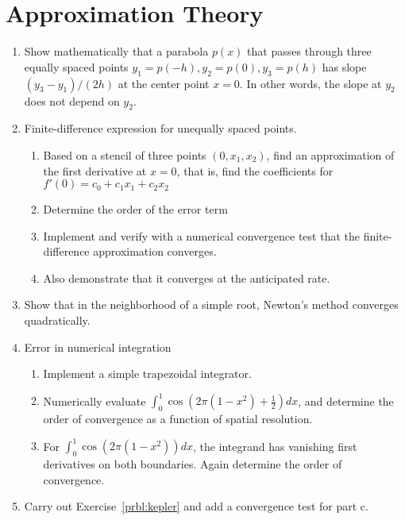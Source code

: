 \documentclass{article}
\begin{document}
\section{Approximation Theory}
\begin{enumerate}
\item \label{prbl:cslope}
Show mathematically that a parabola $p(x)$ that passes through three equally spaced points $y_1=p(-h), y_2=p(0), y_3=p(h)$ has slope $(y_3-y_1)/(2h)$ at the center point $x=0$. In other words, the slope at $y_2$ does not depend on $y_2$.

\item Finite-difference expression for unequally spaced points. \vspace{-1em}
\begin{enumerate}\setlength{\itemsep}{0pt}
\item Based on a stencil of three points $(0,x_1,x_2)$, find an approximation of the first derivative at $x=0$, that is, find the coefficients for $f'(0) = c_0 + c_1 x_1 + c_2 x_2$
\item Determine the order of the error term
\item Implement and verify with a numerical convergence test that the finite-difference approximation converges.
\item Also demonstrate that it converges at the anticipated rate.
\end{enumerate}

\item
  Show that in the neighborhood of a simple root, Newton's method converges quadratically.
  
\item 
Error in numerical integration 
\vspace{-1em}
\begin{enumerate}\setlength{\itemsep}{0pt}
\item Implement a simple trapezoidal integrator. 
\item Numerically evaluate $\int_0^1 \cos(2\pi(1-x^2)+\frac{1}{2}) dx$, and determine the order of convergence as a function of spatial resolution.
\item For $\int_0^1 \cos(2\pi(1-x^2)) dx$, the integrand has vanishing first derivatives on both boundaries.  Again determine the order of convergence.
\end{enumerate}

\item
Carry out Exercise~\ref{prbl:kepler} and add a convergence test for part c.


\end{enumerate}
\end{document}
